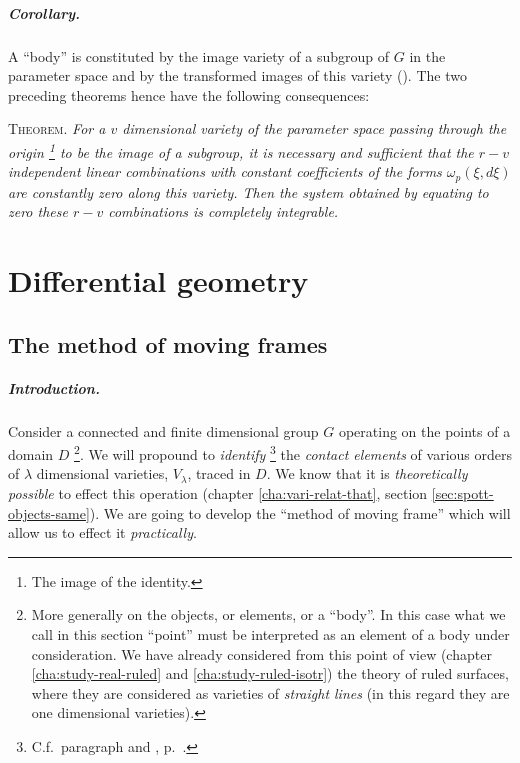 \paragraph{Corollary.}
\label{sec:125}
A ``body'' is constituted by the image variety of a subgroup of $G$ in the parameter space and by the transformed images of this variety (). The two preceding theorems hence have the following consequences:

\somespace

\textsc{Theorem.} \emph{For a $v$ dimensional variety of the parameter space passing through the origin \footnote{The image of the identity.} to be the image of a subgroup, it is necessary and sufficient that the $r-v$ independent linear combinations with constant coefficients of the forms $\omega_{p}(\xi,d\xi)$ are constantly zero along this variety. Then the system obtained by equating to zero these $r-v$ combinations is completely integrable.}

\chapter{Differential geometry}
\label{cha:diff-geom}

\section{The method of moving frames}
\label{sec:method-moving-frames}

\paragraph{Introduction.}
\label{sec:126}
Consider a connected and finite dimensional group $G$ operating on the points of a domain $D$ \footnote{More generally on the objects, or elements, or a ``body''. In this case what we call in this section ``point'' must be interpreted as an element of a body under consideration. We have already considered from this point of view (chapter \ref{cha:study-real-ruled} and \ref{cha:study-ruled-isotr}) the theory of ruled surfaces, where they are considered as varieties of \emph{straight lines} (in this regard they are one dimensional varieties).}. We will propound to \emph{identify} \footnote{C.f.~paragraph  and , p.~\pageref{sec:93}.} the \emph{contact elements} of various orders of $\lambda$ dimensional varieties, $V_{\lambda}$, traced in $D$. We know that it is \emph{theoretically possible} to effect this operation (chapter \ref{cha:vari-relat-that}, section \ref{sec:spott-objects-same}). We are going to develop the ``method of moving frame'' which will allow us to effect it \emph{practically}.

